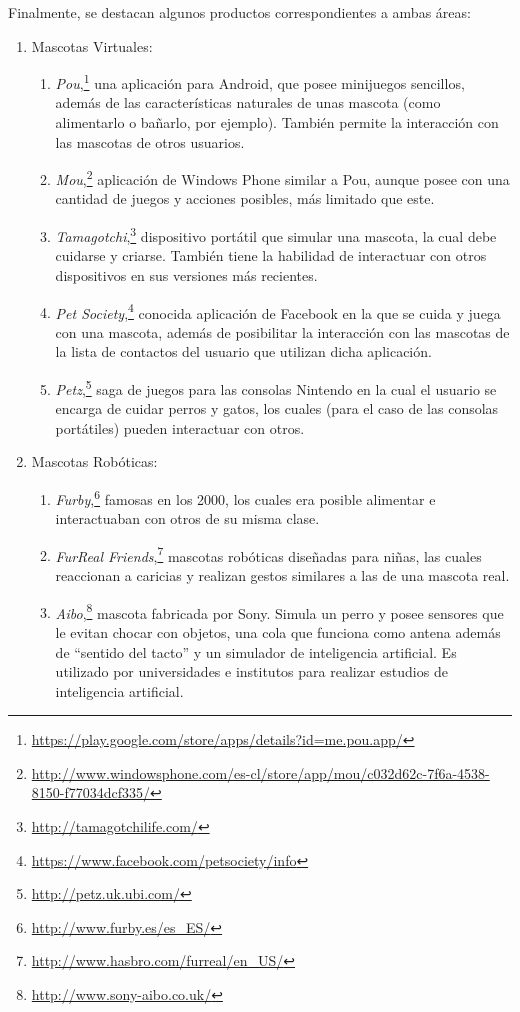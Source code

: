 Finalmente, se destacan algunos productos correspondientes a ambas \'areas:
\begin{enumerate}
\item Mascotas Virtuales:
  \begin{enumerate}
  \item \emph{Pou},\footnote{\url{https://play.google.com/store/apps/details?id=me.pou.app/}} una aplicaci\'on para Android, que posee minijuegos sencillos, adem\'as de las caracter\'isticas naturales de unas mascota (como alimentarlo o ba\~narlo, por ejemplo). Tambi\'en permite la interacci\'on con las mascotas de otros usuarios.
  \item \emph{Mou},\footnote{\url{http://www.windowsphone.com/es-cl/store/app/mou/c032d62c-7f6a-4538-8150-f77034dcf335/}} aplicaci\'on de Windows Phone similar a Pou, aunque posee con una cantidad de juegos y acciones posibles, m\'as limitado que este.
  \item \emph{Tamagotchi},\footnote{\url{http://tamagotchilife.com/}} dispositivo port\'atil que simular una mascota, la cual debe cuidarse y criarse. Tambi\'en tiene la habilidad de interactuar con otros dispositivos en sus versiones m\'as recientes.
  \item \emph{Pet Society},\footnote{\url{https://www.facebook.com/petsociety/info}} conocida aplicaci\'on de Facebook en la que se cuida y juega con una mascota, adem\'as de posibilitar la interacci\'on con las mascotas de la lista de contactos del usuario que utilizan dicha aplicaci\'on.
  \item \emph{Petz},\footnote{\url{http://petz.uk.ubi.com/}} saga de juegos para las consolas Nintendo en la cual el usuario se encarga de cuidar perros y gatos, los cuales (para el caso de las consolas port\'atiles) pueden interactuar con otros.
  \end{enumerate}
\item Mascotas Rob\'oticas:
  \begin{enumerate}
  \item \emph{Furby},\footnote{\url{http://www.furby.es/es_ES/}} famosas en los 2000, los cuales era posible alimentar e interactuaban con otros de su misma clase.
  \item \emph{FurReal Friends},\footnote{\url{http://www.hasbro.com/furreal/en_US/}} mascotas rob\'oticas dise\~nadas para ni\~nas, las cuales reaccionan a caricias y realizan gestos similares a las de una mascota real.
  \item \emph{Aibo},\footnote{\url{http://www.sony-aibo.co.uk/}} mascota fabricada por Sony. Simula un perro y posee sensores que le evitan chocar con objetos, una cola que funciona como antena adem\'as de ``sentido del tacto'' y un simulador de inteligencia artificial. Es utilizado por universidades e institutos para realizar estudios de inteligencia artificial.
  \end{enumerate}
\end{enumerate}


